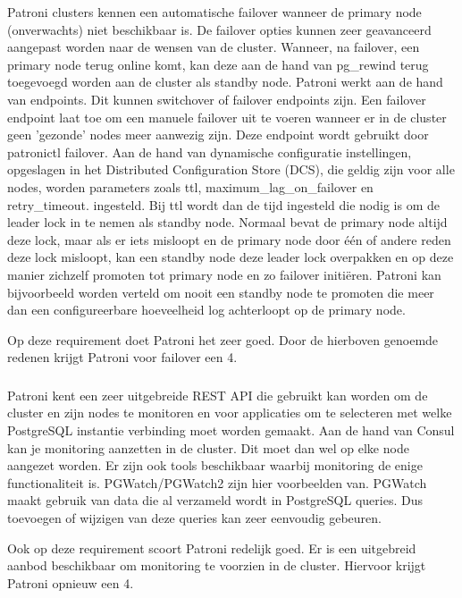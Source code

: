 Patroni clusters kennen een automatische failover wanneer de primary node (onverwachts) niet beschikbaar is. De failover opties kunnen zeer geavanceerd aangepast worden naar de wensen van de cluster. Wanneer, na failover, een primary node terug online komt, kan deze aan de hand van pg\_rewind terug toegevoegd worden aan de cluster als standby node. Patroni werkt aan de hand van endpoints. Dit kunnen switchover of failover endpoints zijn. Een failover endpoint laat toe om een manuele failover uit te voeren wanneer er in de cluster geen 'gezonde' nodes meer aanwezig zijn. Deze endpoint wordt gebruikt door patronictl failover.
Aan de hand van dynamische configuratie instellingen, opgeslagen in het Distributed Configuration Store (DCS), die geldig zijn voor alle nodes, worden parameters zoals ttl, maximum\_lag\_on\_failover en retry\_timeout. ingesteld. Bij ttl wordt dan de tijd ingesteld die nodig is om de leader lock in te nemen als standby node. Normaal bevat de primary node altijd deze lock, maar als er iets misloopt en de primary node door één of andere reden deze lock misloopt, kan een standby node deze leader lock overpakken en op deze manier zichzelf promoten tot primary node en zo failover initiëren. Patroni kan bijvoorbeeld worden verteld om nooit een standby node te promoten die meer dan een configureerbare hoeveelheid log achterloopt op de primary node.

Op deze requirement doet Patroni het zeer goed. Door de hierboven genoemde redenen krijgt Patroni voor failover een 4.

\subsubsection{}
\label{subsubsec:Monitoring}

Patroni kent een zeer uitgebreide REST API die gebruikt kan worden om de cluster en zijn nodes te monitoren en voor applicaties om te selecteren met welke PostgreSQL instantie verbinding moet worden gemaakt. Aan de hand van Consul kan je monitoring aanzetten in de cluster. Dit moet dan wel op elke node aangezet worden.
Er zijn ook tools beschikbaar waarbij monitoring de enige functionaliteit is. PGWatch/PGWatch2 zijn hier voorbeelden van. PGWatch maakt gebruik van data die al verzameld wordt in PostgreSQL queries. Dus toevoegen of wijzigen van deze queries kan zeer eenvoudig gebeuren.

Ook op deze requirement scoort Patroni redelijk goed. Er is een uitgebreid aanbod beschikbaar om monitoring te voorzien in de cluster. Hiervoor krijgt Patroni opnieuw een 4.

